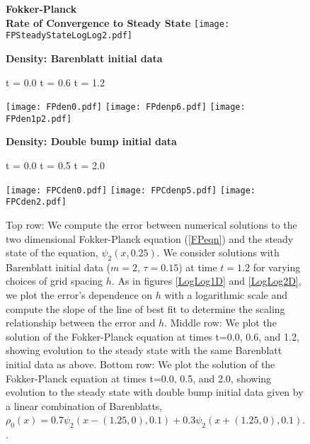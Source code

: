 \documentclass[11pt,leqno]{amsart}
\theoremstyle{definition}
\begin{document}
\begin{figure}[!ht]
\centering
\textbf{Fokker-Planck  \\
Rate of Convergence to Steady State}
\hspace*{-1.6cm}
\texttt{[image: FPSteadyStateLogLog2.pdf]}

\medskip

\textbf{Density: Barenblatt initial data}

 t = 0.0 \hspace{1.5in} t = 0.6 \hspace{1.5in} t = 1.2 \hspace{.05in}

\hspace*{-1.5cm}
\texttt{[image: FPden0.pdf]}
\texttt{[image: FPdenp6.pdf]}
\texttt{[image: FPden1p2.pdf]}

\medskip

\textbf{Density: Double bump initial data}

 t = 0.0 \hspace{1.5in} t = 0.5 \hspace{1.5in} t = 2.0 \hspace{.05in}

\hspace*{-1.5cm}
\texttt{[image: FPCden0.pdf]}
\texttt{[image: FPCdenp5.pdf]}
\texttt{[image: FPCden2.pdf]}
	\caption{Top row: We compute the error between numerical solutions to the two dimensional Fokker-Planck equation  (\ref{FPeqn}) and the steady state of the equation, $\psi_2(x,0.25)$. We consider solutions with Barenblatt initial data ($m=2$, $\tau = 0.15$) at time $t = 1.2$ for varying choices of grid spacing $h$. As in figures \ref{LogLog1D} and \ref{LogLog2D}, we plot the error's dependence on $h$ with a logarithmic scale and compute the slope of the line of best fit to determine the scaling relationship between the error and $h$.  Middle row: We plot the solution of the Fokker-Planck equation at times t=0.0, 0.6, and 1.2, showing evolution to the steady state with the same Barenblatt initial data as above. Bottom row:  We plot the solution of the Fokker-Planck equation at times t=0.0, 0.5, and 2.0, showing evolution to the steady state with double bump initial data given by a linear combination of Barenblatts, $\rho_0(x) = 0.7\psi_2(x-(1.25,0),0.1)+0.3\psi_2(x+(1.25,0),0.1)$.  \label{FPfig}
	.}
\end{figure}
\end{document}
